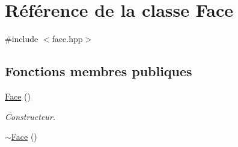 \hypertarget{class_face}{\section{Référence de la classe Face}
\label{class_face}
}


{\ttfamily \#include $<$face.\-hpp$>$}

\subsection*{Fonctions membres publiques}
\begin{DoxyCompactItemize}
\item 
\hypertarget{class_face_afdb634bc2d5287ba0d62e46b57e9dc2e}{\hyperlink{class_face_afdb634bc2d5287ba0d62e46b57e9dc2e}{Face} ()}\label{class_face_afdb634bc2d5287ba0d62e46b57e9dc2e}

\begin{DoxyCompactList}\small\item\em Constructeur. \end{DoxyCompactList}\item 
\hypertarget{class_face_a182c8c9ba652d46b01fdf6816cd65590}{\hyperlink{class_face_a182c8c9ba652d46b01fdf6816cd65590}{$\sim$\-Face} ()}\label{class_face_a182c8c9ba652d46b01fdf6816cd65590}


\end{DoxyCompactItemize}
